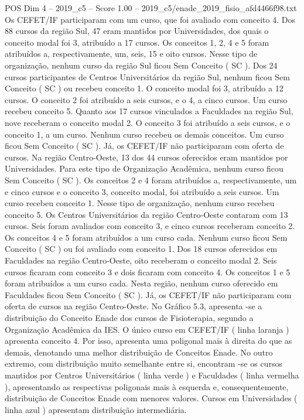 \begin{textsample}{POS Dim 4 – 2019\_c5 – Score 1.00 – 2019\_c5/enade\_2019\_fisio\_afd4466f98.txt}
Os CEFET/IF participaram com um curso, que foi avaliado com conceito 4.
Dos 88 cursos da região Sul, 47 eram mantidos por Universidades, dos quais o conceito modal foi 3, atribuído a 17 cursos.
Os conceitos 1, 2, 4 e 5 foram atribuídos a, respectivamente, um, seis, 15 e oito cursos.
Nesse tipo de organização, nenhum curso da região Sul ficou Sem Conceito ( SC ).
Dos 24 cursos participantes de Centros Universitários da região Sul, nenhum ficou Sem Conceito ( SC ) ou recebeu conceito 1.
O conceito modal foi 3, atribuído a 12 cursos.
O conceito 2 foi atribuído a seis cursos, e o 4, a cinco cursos.
Um curso recebeu conceito 5.
Quanto aos 17 cursos vinculados a Faculdades na região Sul, nove receberam o conceito modal 2.
O conceito 3 foi atribuído a seis cursos, e o conceito 1, a um curso.
Nenhum curso recebeu os demais conceitos.
Um curso ficou Sem Conceito ( SC ).
Já, os CEFET/IF não participaram com oferta de cursos.
Na região Centro-Oeste, 13 dos 44 cursos oferecidos eram mantidos por Universidades.
Para este tipo de Organização Acadêmica, nenhum curso ficou Sem Conceito ( SC ).
Os conceitos 2 e 4 foram atribuídos a, respectivamente, um e cinco cursos e o conceito 3, conceito modal, foi atribuído a seis cursos.
Um curso recebeu conceito 1.
Nesse tipo de organização, nenhum curso recebeu conceito 5.
Os Centros Universitários da região Centro-Oeste contaram com 13 cursos.
Seis foram avaliados com conceito 3, e cinco cursos receberam conceito 2.
Os conceitos 4 e 5 foram atribuídos a um curso cada.
Nenhum curso ficou Sem Conceito ( SC ) ou foi avaliado com conceito 1.
Dos 18 cursos oferecidos em Faculdades na região Centro-Oeste, oito receberam o conceito modal 2.
Seis cursos ficaram com conceito 3 e dois ficaram com conceito 4.
Os conceitos 1 e 5 foram atribuídos a um curso cada.
Nesta região, nenhum curso oferecido em Faculdades ficou Sem Conceito ( SC ).
Já, os CEFET/IF não participaram com oferta de cursos na região Centro-Oeste.
No Gráfico 5.3, apresenta -se a distribuição do Conceito Enade dos cursos de Fisioterapia, segundo a Organização Acadêmica da IES.
O único curso em CEFET/IF ( linha laranja ) apresenta conceito 4.
Por isso, apresenta uma poligonal mais à direita do que as demais, denotando uma melhor distribuição de Conceitos Enade.
No outro extremo, com distribuição muito semelhante entre si, encontram -se os cursos mantidos por Centros Universitários ( linha verde ) e Faculdades ( linha vermelha ), apresentando as respectivas poligonais mais à esquerda e, consequentemente, distribuição de Conceitos Enade com menores valores.
Cursos em Universidades ( linha azul ) apresentam distribuição intermediária.

\end{textsample}
